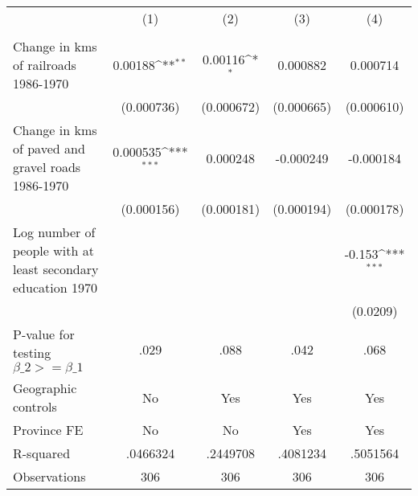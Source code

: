 {
\def\sym#1{\ifmmode^{#1}\else\(^{#1}\)\fi}
\begin{tabular}{l*{4}{c}}
\hline\hline
                &\multicolumn{1}{c}{(1)}&\multicolumn{1}{c}{(2)}&\multicolumn{1}{c}{(3)}&\multicolumn{1}{c}{(4)}\\
                &\multicolumn{1}{c}{}&\multicolumn{1}{c}{}&\multicolumn{1}{c}{}&\multicolumn{1}{c}{}\\
\hline
Change in kms of railroads 1986-1970&  0.00188\sym{**} &  0.00116\sym{*}  & 0.000882         & 0.000714         \\
                &(0.000736)         &(0.000672)         &(0.000665)         &(0.000610)         \\
[1em]
Change in kms of paved and gravel roads 1986-1970& 0.000535\sym{***}& 0.000248         &-0.000249         &-0.000184         \\
                &(0.000156)         &(0.000181)         &(0.000194)         &(0.000178)         \\
[1em]
Log number of people with at least secondary education 1970&                  &                  &                  &   -0.153\sym{***}\\
                &                  &                  &                  & (0.0209)         \\
\hline
P-value for testing $\beta\_{2} >= \beta\_{1}$&     .029         &     .088         &     .042         &     .068         \\
Geographic controls&       No         &      Yes         &      Yes         &      Yes         \\
Province FE     &       No         &       No         &      Yes         &      Yes         \\
R-squared       & .0466324         & .2449708         & .4081234         & .5051564         \\
Observations    &      306         &      306         &      306         &      306         \\
\hline\hline
\end{tabular}
}
